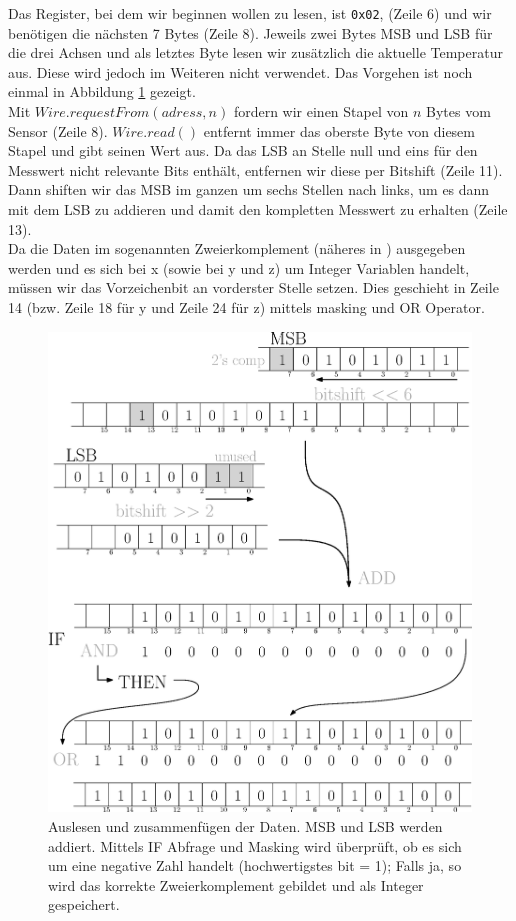\documentclass[12pt,a4paper,twoside,BCOR=12.5mm]{scrartcl}
\begin{document}
Das Register, bei dem wir beginnen wollen zu lesen, ist \texttt{0x02}, (Zeile 6) und wir benötigen die nächsten 7 Bytes (Zeile 8). Jeweils zwei Bytes MSB und LSB für die drei Achsen und als letztes Byte lesen wir zusätzlich die aktuelle Temperatur aus. Diese wird jedoch im Weiteren nicht verwendet. Das Vorgehen ist noch einmal in Abbildung \ref{auslesen} gezeigt.\\

Mit $Wire.requestFrom(adress, n)$ fordern wir einen Stapel von $n$ Bytes vom Sensor (Zeile 8). $Wire.read()$ entfernt immer das oberste Byte von diesem Stapel und gibt seinen Wert aus. Da das LSB an Stelle null und eins für den Messwert nicht relevante Bits enthält, entfernen wir diese per Bitshift (Zeile 11). Dann shiften wir das MSB im ganzen um sechs Stellen nach links, um es dann mit dem LSB zu addieren und damit den kompletten Messwert zu erhalten (Zeile 13).\\

Da die Daten im sogenannten Zweierkomplement (näheres in \citep{Tietze:2002fk}) ausgegeben werden und es sich bei x (sowie bei y und z) um Integer Variablen handelt, müssen wir das Vorzeichenbit an vorderster Stelle setzen. Dies geschieht in Zeile 14 (bzw. Zeile 18 für y und Zeile 24 für z) mittels masking und OR Operator.\\

\begin{figure}[htb]
\centering
\includegraphics[scale=.7]{auslesen.eps}
\caption{Auslesen und zusammenfügen der Daten. MSB und LSB werden addiert. Mittels IF Abfrage und Masking wird überprüft, ob es sich um eine negative Zahl handelt (hochwertigstes bit = 1); Falls ja, so wird das korrekte Zweierkomplement gebildet und als Integer gespeichert.}
\label{auslesen}
\end{figure}
\end{document}
